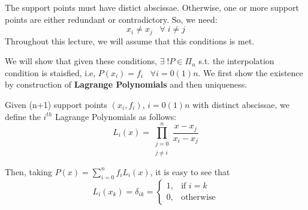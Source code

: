 \begin{rmark}
	The support points must have distict abscissae. Otherwise, one or more support points are either redundant or contradictory. So, we need:
	$$x_i \neq x_j \;\;\;\forall\;i\neq j$$
	Throughout this lecture, we will assume that this conditions is met.
\end{rmark}

We will show that given these conditions, $\exists\;! P \in \Pi_n$ s.t. the interpolation condition is staisfied, i.e, $P(x_i) = f_i\;\;\;\forall i=0(1)n$. We first show the existence by construction of \textbf{Lagrange Polynomials} and then uniqueness.\\

\begin{defn}
	Given (n+1) support points $(x_i,f_i)$, $i = 0(1)n$ with distinct abscissae, we define the $i^{th}$ Lagrange Polynomials as follows:
	$$L_i(x) = \prod^n_{\substack{ j = 0\\j \neq i}} \frac{x - x_j}{x_i - x_j}$$
\end{defn}


Then, taking $P(x) =  \sum_{i=0}^{n} f_i L_i(x)$, it is easy to see that
$$L_i(x_k) = \delta_{ik} =
	\begin{cases}
		1, & \text{if }i=k    \\
		0, & \text{otherwise}
	\end{cases}
$$

